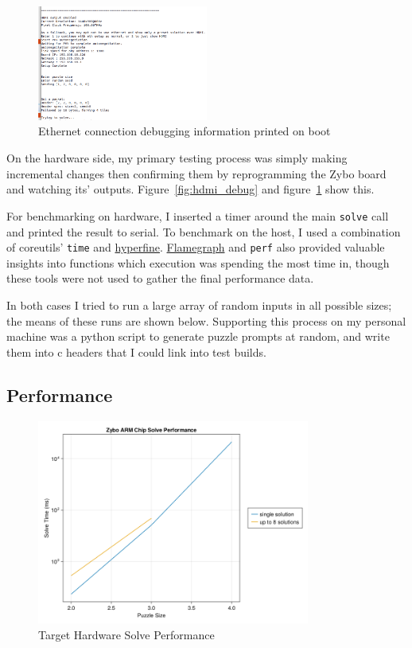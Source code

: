 \documentclass[11pt]{article}
\begin{document}
\begin{figure}[h]
  \centering
  \includegraphics[width=0.5\textwidth]{eth_serialout}
  \caption{Ethernet connection debugging information printed on boot}
  \label{fig:eth_debug}
\end{figure}

On the hardware side, my primary testing process was simply making incremental changes then confirming them by reprogramming the Zybo board and watching its' outputs.
Figure~\ref{fig:hdmi_debug} and figure~\ref{fig:eth_debug} show this.

For benchmarking on hardware, I inserted a timer around the main \verb|solve| call and printed the result to serial.
To benchmark on the host, I used a combination of coreutils' \verb|time| and \href{https://github.com/sharkdp/hyperfine}{hyperfine}.
\href{https://github.com/brendangregg/FlameGraph}{Flamegraph} and \verb|perf| also provided valuable insights into functions which execution was spending the most time in, though these tools were not used to gather the final performance data.

In both cases I tried to run a large array of random inputs in all possible sizes; the means of these runs are shown below.
Supporting this process on my personal machine was a python script to generate puzzle prompts at random, and write them into c headers that I could link into test builds.



\subsection{Performance}\label{sec:performance}

\begin{figure}[h]
  \centering
  \includegraphics[width=0.8\textwidth]{fpga_perf}
  \caption{Target Hardware Solve Performance}
  \label{fig:fpga_graph}
\end{figure}
\end{document}
